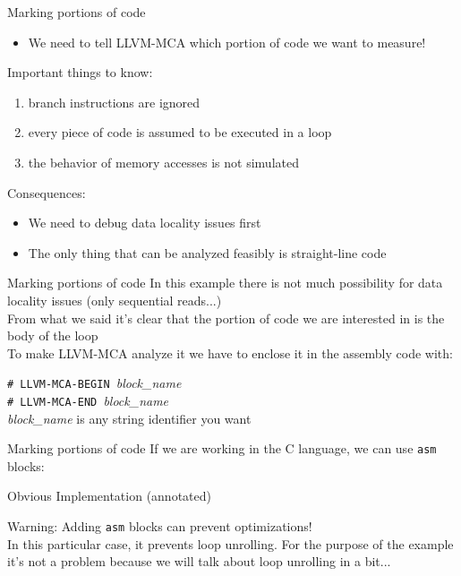 \begin{frame}{Marking portions of code}
\begin{itemize}
\item We need to tell LLVM-MCA which portion of code we want to measure!
\end{itemize}
\bigskip
Important things to know:
\begin{enumerate}
\item branch instructions are ignored
\item every piece of code is assumed to be executed in a loop
\item the behavior of memory accesses is not simulated
\end{enumerate}
\bigskip
Consequences:
\begin{itemize}
\item We need to debug data locality issues \alert{first}
\item The only thing that can be analyzed feasibly is straight-line code
\end{itemize}
\end{frame}


\begin{frame}{Marking portions of code}
In this example there is not much possibility for data locality
issues (only sequential reads...)\\
\bigskip
From what we said it's clear that the portion of code we are interested
in is the \alert{body of the loop}\\
\medskip
To make LLVM-MCA analyze it we have to enclose it \alert{in the assembly code}
with:\\
\smallskip
\begin{center}
\large
\texttt{\# LLVM-MCA-BEGIN }\textit{block\_name}\\
\smallskip
\texttt{\# LLVM-MCA-END }\textit{block\_name}\\
\medskip
{\footnotesize \textit{block\_name} is any string identifier you want}
\end{center}
\end{frame}


\begin{frame}{Marking portions of code}
If we are working in the C language, we can use \texttt{asm} blocks:
\begin{block}{Obvious Implementation (annotated)}
\end{block}
\bigskip
\alert{Warning:} Adding \texttt{asm} blocks can prevent optimizations!\\
\smallskip
{\footnotesize In this particular case, it prevents \alert{loop unrolling}.
For the purpose of the example it's not a problem because we will talk about
loop unrolling in a bit...}
\end{frame}


